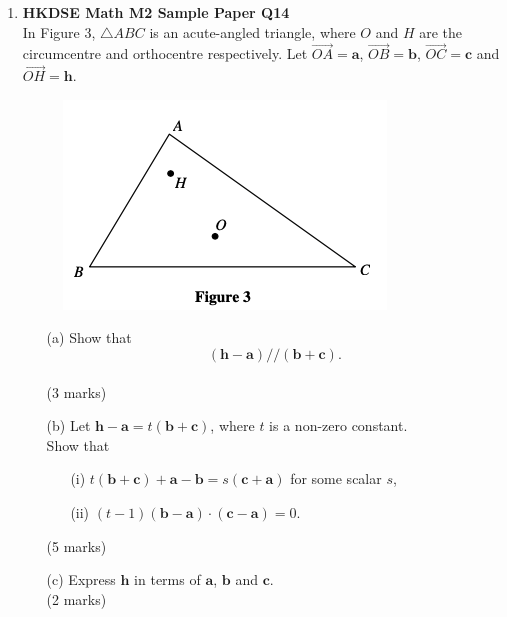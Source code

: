 \documentclass{report}
\begin{document}
\begin{enumerate}
	\item \textbf{HKDSE Math M2 Sample Paper Q14}\\
	In Figure 3, $\triangle ABC$ is an acute-angled triangle, where $O$ and $H$ are the circumcentre and orthocentre respectively. Let $\overrightarrow{OA} = \textbf{a}$, $\overrightarrow{OB} = \textbf{b}$, $\overrightarrow{OC} = \textbf{c}$ and $\overrightarrow{OH} = \textbf{h}$.
	\begin{figure}[H]
		\centering
		\includegraphics[width = .5\linewidth]{SPFigure3}
	\end{figure}
	\begin{enumerate}
		\item [(a)]Show that $$(\textbf{h} - \textbf{a})//(\textbf{b}+\textbf{c}).$$ \\(3 marks)
		\item [(b)]Let $\textbf{h} - \textbf{a} = t(\textbf{b}+\textbf{c})$, where $t$ is a non-zero constant.\\
		Show that 
		\begin{enumerate}
			\item [(i)]$t(\textbf{b}+\textbf{c}) + \textbf{a} - \textbf{b} = s(\textbf{c}+\textbf{a})$ for some scalar $s$, 
			\item [(ii)]$(t-1)(\textbf{b}-\textbf{a})\cdot (\textbf{c}-\textbf{a}) = 0$.
		\end{enumerate}
		(5 marks)
		\item[(c)]Express $\textbf{h}$ in terms of $\textbf{a}$, $\textbf{b}$ and $\textbf{c}$. \\(2 marks)
	\end{enumerate}

\end{enumerate}
\end{document}
